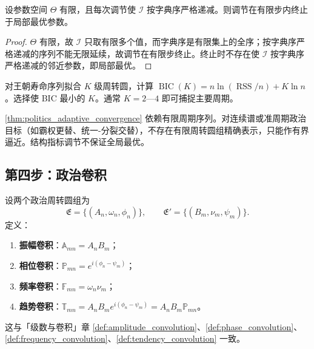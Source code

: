 \begin{proposition}[结构指标调节的有限收敛]\label{prop:politics_structure_metric_convergence}
设参数空间 $\Theta$ 有限，且每次调节使 $\mathcal I$ 按字典序严格递减。则调节在有限步内终止于局部最优参数。
\end{proposition}

\begin{proof}
$\Theta$ 有限，故 $\mathcal I$ 只取有限多个值，而字典序是有限集上的全序；按字典序严格递减的序列不能无限延续，故调节在有限步终止。终止时不存在使 $\mathcal I$ 按字典序严格递减的邻近参数，即局部最优。
\end{proof}

\begin{example}\label{ex:politics_bic}
对王朝寿命序列拟合 $K$ 级周转圆，计算 $\operatorname{BIC}(K)=n\ln(\operatorname{RSS}/n)+K\ln n$。选择使 BIC 最小的 $K$。通常 $K=2$—$4$ 即可捕捉主要周期。
\end{example}

\begin{remark}[动态调节的边界]\label{rem:politics_adaptive_boundary}
\cref{thm:politics_adaptive_convergence} 依赖有限周期序列。对连续谱或准周期政治目标（如霸权更替、统一-分裂交替），不存在有限周转圆组精确表示，只能作有界逼近。结构指标调节不保证全局最优。
\end{remark}

\subsection{第四步：政治卷积}

\begin{definition}\label{def:politics_convolution_types}
设两个政治周转圆组为
\[
\mathfrak E=\{(A_n,\omega_n,\phi_n)\},\qquad
\mathfrak E'=\{(B_m,\nu_m,\psi_m)\}.
\]
定义：
\begin{enumerate}[label=(\roman*)]
    \item \textbf{振幅卷积}：$\mathbb A_{mn}=A_nB_m$；
    \item \textbf{相位卷积}：$\mathbb P_{mn}=e^{i(\phi_n-\psi_m)}$；
    \item \textbf{频率卷积}：$\mathbb F_{mn}=\omega_n\nu_m$；
    \item \textbf{趋势卷积}：$\mathbb T_{mn}=A_nB_m e^{i(\phi_n-\psi_m)}=A_nB_m\mathbb P_{mn}$。
\end{enumerate}
这与「级数与卷积」章 \cref{def:amplitude_convolution}、\cref{def:phase_convolution}、\cref{def:frequency_convolution}、\cref{def:tendency_convolution} 一致。
\end{definition}

